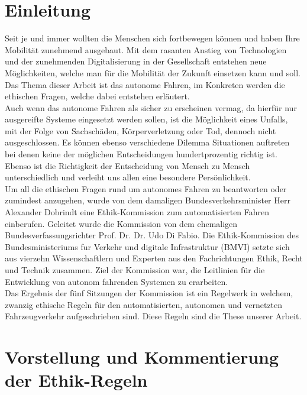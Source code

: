 \documentclass[twoside,a4paper,12pt]{article}
\begin{document}
\section{Einleitung} \label{Einleitung}
Seit je und immer wollten die Menschen sich fortbewegen können und haben Ihre Mobilität zunehmend ausgebaut. Mit dem rasanten Anstieg von Technologien und der zunehmenden Digitalisierung in der Gesellschaft entstehen neue Möglichkeiten, welche man für die Mobilität der Zukunft einsetzen kann und soll. Das Thema dieser Arbeit ist das autonome Fahren, im Konkreten werden die ethischen Fragen, welche dabei entstehen erläutert. \\ Auch wenn das autonome Fahren als sicher zu erscheinen vermag, da hierfür nur ausgereifte Systeme eingesetzt werden sollen, ist die Möglichkeit eines Unfalls, mit der Folge von Sachschäden, Körperverletzung oder Tod, dennoch nicht ausgeschlossen. Es können ebenso verschiedene Dilemma Situationen auftreten bei denen keine der möglichen Entscheidungen hundertprozentig richtig ist. Ebenso ist die Richtigkeit der Entscheidung von Mensch zu Mensch unterschiedlich und verleiht uns allen eine besondere Persönlichkeit. \\ Um all die ethischen Fragen rund um autonomes Fahren zu beantworten oder zumindest anzugehen, wurde von dem damaligen Bundesverkehrsminister Herr Alexander Dobrindt eine Ethik-Kommission zum automatisierten Fahren einberufen. Geleitet wurde die Kommission von dem ehemaligen Bundesverfassungsrichter Prof. Dr. Dr. Udo Di Fabio. Die Ethik-Kommission des Bundesministeriums fur Verkehr und digitale Infrastruktur (BMVI) setzte sich aus vierzehn Wissenschaftlern und Experten aus den Fachrichtungen Ethik, Recht und Technik zusammen. \cite{bmvi1} Ziel der Kommission war, die Leitlinien für die Entwicklung von autonom fahrenden Systemen zu erarbeiten. \\
Das Ergebnis der fünf Sitzungen der Kommission ist ein Regelwerk in welchem, zwanzig ethische Regeln für den automatisierten, autonomen
und vernetzten Fahrzeugverkehr aufgeschrieben sind. Diese Regeln sind die These unserer Arbeit. 

\newpage

\tableofcontents


\listoffigures

\newpage

\mainmatter

\cleardoublepage
\section{Vorstellung und Kommentierung der Ethik-Regeln} \label{VorstellungUndKommentierungDerEthikRegeln}
\end{document}
